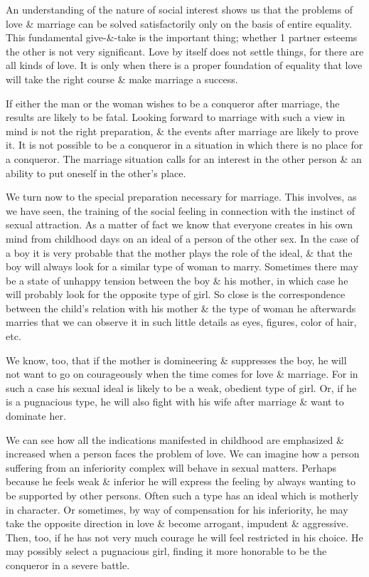 \documentclass{article}
\begin{document}
An understanding of the nature of social interest shows us that the problems of love \& marriage can be solved satisfactorily only on the basis of entire equality. This fundamental give-\&-take is the important thing; whether 1 partner esteems the other is not very significant. Love by itself does not settle things, for there are all kinds of love. It is only when there is a proper foundation of equality that love will take the right course \& make marriage a success.

If either the man or the woman wishes to be a conqueror after marriage, the results are likely to be fatal. Looking forward to marriage with such a view in mind is not the right preparation, \& the events after marriage are likely to prove it. It is not possible to be a conqueror in a situation in which there is no place for a conqueror. The marriage situation calls for an interest in the other person \& an ability to put oneself in the other's place.

We turn now to the special preparation necessary for marriage. This involves, as we have seen, the training of the social feeling in connection with the instinct of sexual attraction. As a matter of fact we know that everyone creates in his own mind from childhood days on an ideal of a person of the other sex. In the case of a boy it is very probable that the mother plays the role of the ideal, \& that the boy will always look for a similar type of woman to marry. Sometimes there may be a state of unhappy tension between the boy \& his mother, in which case he will probably look for the opposite type of girl. So close is the correspondence between the child's relation with his mother \& the type of woman he afterwards marries that we can observe it in such little details as eyes, figures, color of hair, etc.

We know, too, that if the mother is domineering \& suppresses the boy, he will not want to go on courageously when the time comes for love \& marriage. For in such a case his sexual ideal is likely to be a weak, obedient type of girl. Or, if he is a pugnacious type, he will also fight with his wife after marriage \& want to dominate her.

We can see how all the indications manifested in childhood are emphasized \& increased when a person faces the problem of love. We can imagine how a person suffering from an inferiority complex will behave in sexual matters. Perhaps because he feels weak \& inferior he will express the feeling by always wanting to be supported by other persons. Often such a type has an ideal which is motherly in character. Or sometimes, by way of compensation for his inferiority, he may take the opposite direction in love \& become arrogant, impudent \& aggressive. Then, too, if he has not very much courage he will feel restricted in his choice. He may possibly select a pugnacious girl, finding it more honorable to be the conqueror in a severe battle. 
\end{document}
